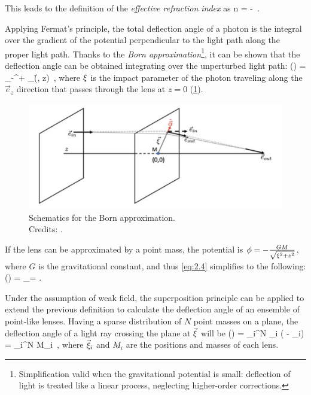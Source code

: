 This leads to the definition of the \emph{effective refraction index} as
\be
\label{eq:2.3}
n =   -   \,.
\ee
    
Applying Fermat's principle, the total deflection angle of a photon is the integral over the gradient of the potential perpendicular to the light path along the proper light path. Thanks to the \emph{Born approximation}\footnote{Simplification valid when the gravitational potential is small: deflection of light is treated like a linear process, neglecting higher-order corrections.}, it can be shown \citep{schneider_gravitational_1992} that the deflection angle can be obtained integrating over the unperturbed light path:
\be
\label{eq:2.4}
\hat{\va{\a}} (\va{\x}) =  \int_{-\infty}^{+\infty} \va{\nabla}_\perp \f (\va{\x}, z)  \,,
\ee   
where $\xi$ is the impact parameter of the photon traveling along the $\vec{e}_z$ direction that passes through the lens at $z=0$ (\cref{fig:bornapprox}).

\begin{figure}
    \centering
    \includegraphics[width=\linewidth, keepaspectratio]{img//chapter2/bornapprox.png}
    \caption[Born approximation schematics]{Schematics for the Born approximation.\\\small{Credits: \cite{meneghetti_introduction_2021}.}}
    \label{fig:bornapprox}
\end{figure}

If the lens can be approximated by a point mass, the potential is $\phi = -\frac{G M}{\sqrt{\xi^2 + z^2}}$, where $G$ is the gravitational constant, and thus \cref{eq:2.4} simplifies to the following:
\be
\label{eq:2.5}
\hat{\va{\a}} (\va{\x}) =  _\x =  \va{\x} \;.
\ee

Under the assumption of weak field, the superposition principle can be applied to extend the previous definition to calculate the deflection angle of an ensemble of point-like lenses. Having a sparse distribution of $N$ point masses on a plane, the deflection angle of a light ray crossing the plane at $\va{\xi}$ will be
\be
\label{eq:2.6}
\hat{\va{\a}} (\va{\x}) = \sum_i^N \hat{\va{\a}}_i (\va{\x} - \va{\x}_i) =  \sum_i^N M_i  \,,
\ee
where $\va{\xi}_i$ and $M_i$ are the positions and masses of each lens.

